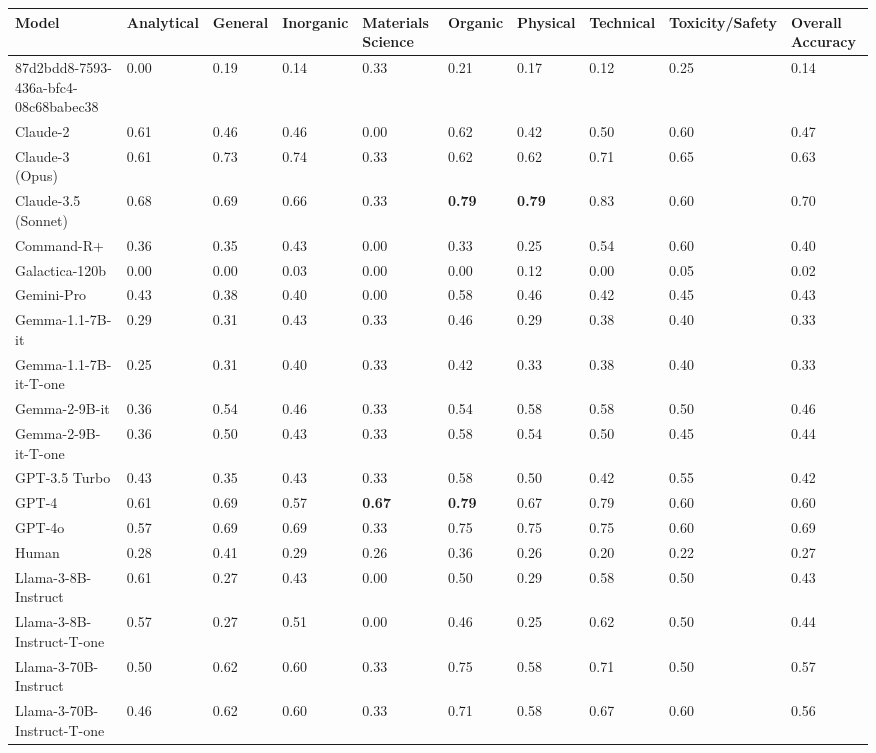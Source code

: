 \begin{tabular}{llllllllll}
\toprule
Model & Analytical & General & Inorganic & Materials Science & Organic & Physical & Technical & Toxicity/Safety & Overall Accuracy \\
\midrule
87d2bdd8-7593-436a-bfc4-08c68babec38 & 0.00 & 0.19 & 0.14 & 0.33 & 0.21 & 0.17 & 0.12 & 0.25 & 0.14 \\
Claude-2 & 0.61 & 0.46 & 0.46 & 0.00 & 0.62 & 0.42 & 0.50 & 0.60 & 0.47 \\
Claude-3 (Opus) & 0.61 & 0.73 & 0.74 & 0.33 & 0.62 & 0.62 & 0.71 & 0.65 & 0.63 \\
Claude-3.5 (Sonnet) & 0.68 & 0.69 & 0.66 & 0.33 & \textbf{0.79} & \textbf{0.79} & 0.83 & 0.60 & 0.70 \\
Command-R+ & 0.36 & 0.35 & 0.43 & 0.00 & 0.33 & 0.25 & 0.54 & 0.60 & 0.40 \\
Galactica-120b & 0.00 & 0.00 & 0.03 & 0.00 & 0.00 & 0.12 & 0.00 & 0.05 & 0.02 \\
Gemini-Pro & 0.43 & 0.38 & 0.40 & 0.00 & 0.58 & 0.46 & 0.42 & 0.45 & 0.43 \\
Gemma-1.1-7B-it & 0.29 & 0.31 & 0.43 & 0.33 & 0.46 & 0.29 & 0.38 & 0.40 & 0.33 \\
Gemma-1.1-7B-it-T-one & 0.25 & 0.31 & 0.40 & 0.33 & 0.42 & 0.33 & 0.38 & 0.40 & 0.33 \\
Gemma-2-9B-it & 0.36 & 0.54 & 0.46 & 0.33 & 0.54 & 0.58 & 0.58 & 0.50 & 0.46 \\
Gemma-2-9B-it-T-one & 0.36 & 0.50 & 0.43 & 0.33 & 0.58 & 0.54 & 0.50 & 0.45 & 0.44 \\
GPT-3.5 Turbo & 0.43 & 0.35 & 0.43 & 0.33 & 0.58 & 0.50 & 0.42 & 0.55 & 0.42 \\
GPT-4 & 0.61 & 0.69 & 0.57 & \textbf{0.67} & \textbf{0.79} & 0.67 & 0.79 & 0.60 & 0.60 \\
GPT-4o & 0.57 & 0.69 & 0.69 & 0.33 & 0.75 & 0.75 & 0.75 & 0.60 & 0.69 \\
Human & 0.28 & 0.41 & 0.29 & 0.26 & 0.36 & 0.26 & 0.20 & 0.22 & 0.27 \\
Llama-3-8B-Instruct & 0.61 & 0.27 & 0.43 & 0.00 & 0.50 & 0.29 & 0.58 & 0.50 & 0.43 \\
Llama-3-8B-Instruct-T-one & 0.57 & 0.27 & 0.51 & 0.00 & 0.46 & 0.25 & 0.62 & 0.50 & 0.44 \\
Llama-3-70B-Instruct & 0.50 & 0.62 & 0.60 & 0.33 & 0.75 & 0.58 & 0.71 & 0.50 & 0.57 \\
Llama-3-70B-Instruct-T-one & 0.46 & 0.62 & 0.60 & 0.33 & 0.71 & 0.58 & 0.67 & 0.60 & 0.56 \\

\end{tabular}
